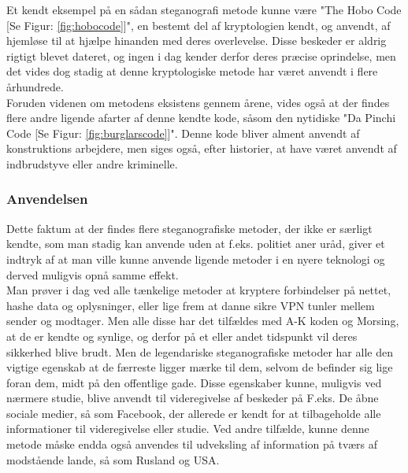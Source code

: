 \noindent
Et kendt eksempel på en sådan steganografi metode kunne være "The Hobo Code [Se Figur: \ref{fig:hobocode}]", en bestemt del af kryptologien kendt, og anvendt, af hjemløse til at hjælpe hinanden med deres overlevelse\cite{TheHoboCode}. Disse beskeder er aldrig rigtigt blevet dateret, og ingen i dag kender derfor deres præcise oprindelse, men det vides dog stadig at denne kryptologiske metode har været anvendt i flere århundrede.\\ 
Foruden videnen om metodens eksistens gennem årene, vides også at der findes flere andre ligende afarter af denne kendte kode, såsom den nytidiske "Da Pinchi Code [Se Figur: \ref{fig:burglarscode}]". Denne kode bliver alment anvendt af konstruktions arbejdere, men siges også, efter historier, at have været anvendt af indbrudstyve eller andre kriminelle.\cite{DaPinchiCode}

\subsubsection{Anvendelsen}
Dette faktum at der findes flere steganografiske metoder, der ikke er særligt kendte, som man stadig kan anvende uden at f.eks. politiet aner uråd, giver et indtryk af at man ville kunne anvende ligende metoder i en nyere teknologi og derved muligvis opnå samme effekt. \\
Man prøver i dag ved alle tænkelige metoder at kryptere forbindelser på nettet, hashe data og oplysninger, eller lige frem at danne sikre VPN tunler mellem sender og modtager. Men alle disse har det tilfældes med A-K koden og Morsing, at de er kendte og synlige, og derfor på et eller andet tidspunkt vil deres sikkerhed blive brudt. Men de legendariske steganografiske metoder har alle den vigtige egenskab at de færreste ligger mærke til dem, selvom de befinder sig lige foran dem, midt på den offentlige gade. Disse egenskaber kunne, muligvis ved nærmere studie, blive anvendt til videregivelse af beskeder på F.eks. De åbne sociale medier, så som Facebook, der allerede er kendt for at tilbageholde alle informationer til videregivelse eller studie. Ved andre tilfælde, kunne denne metode måske endda også anvendes til udveksling af information på tværs af modstående lande, så som Rusland og USA.




